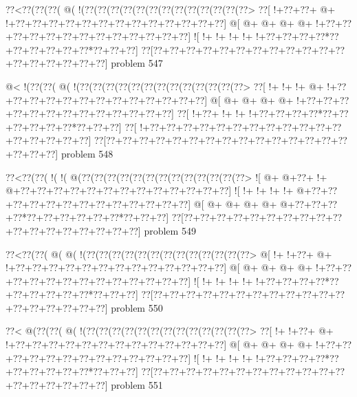 \vbox{\vbox{\goo
\0??<\0??(\0??(\0??(\- @(\- !(\0??(\0??(\0??(\0??(\0??(\0??(\0??(\0??(\0??(\0??(\0??(\0??(\0??>
\0??[\- !+\0??+\0??+\- @+\- !+\0??+\0??+\0??+\0??+\0??+\0??+\0??+\0??+\0??+\0??+\0??+\0??+\0??]
\- @[\- @+\- @+\- @+\- @+\- !+\0??+\0??+\0??+\0??+\0??+\0??+\0??+\0??+\0??+\0??+\0??+\0??+\0??]
\- ![\- !+\- !+\- !+\- !+\- !+\0??+\0??+\0??+\0??*\0??+\0??+\0??+\0??+\0??+\0??*\0??+\0??+\0??]
\0??[\0??+\0??+\0??+\0??+\0??+\0??+\0??+\0??+\0??+\0??+\0??+\0??+\0??+\0??+\0??+\0??+\0??+\0??]
}
\hfil problem 547\hfil\break
}



\vbox{\vbox{\goo
\- @<\- !(\0??(\0??(\- @(\- !(\0??(\0??(\0??(\0??(\0??(\0??(\0??(\0??(\0??(\0??(\0??(\0??(\0??>
\0??[\- !+\- !+\- !+\- @+\- !+\0??+\0??+\0??+\0??+\0??+\0??+\0??+\0??+\0??+\0??+\0??+\0??+\0??]
\- @[\- @+\- @+\- @+\- @+\- !+\0??+\0??+\0??+\0??+\0??+\0??+\0??+\0??+\0??+\0??+\0??+\0??+\0??]
\0??[\- !+\0??+\- !+\- !+\- !+\0??+\0??+\0??+\0??*\0??+\0??+\0??+\0??+\0??+\0??*\0??+\0??+\0??]
\0??[\- !+\0??+\0??+\0??+\0??+\0??+\0??+\0??+\0??+\0??+\0??+\0??+\0??+\0??+\0??+\0??+\0??+\0??]
\0??[\0??+\0??+\0??+\0??+\0??+\0??+\0??+\0??+\0??+\0??+\0??+\0??+\0??+\0??+\0??+\0??+\0??+\0??]
}
\hfil problem 548\hfil\break
}



\vbox{\vbox{\goo
\0??<\0??(\0??(\- !(\- !(\- @(\0??(\0??(\0??(\0??(\0??(\0??(\0??(\0??(\0??(\0??(\0??(\0??(\0??>
\- ![\- @+\- @+\0??+\- !+\- @+\0??+\0??+\0??+\0??+\0??+\0??+\0??+\0??+\0??+\0??+\0??+\0??+\0??]
\- ![\- !+\- !+\- !+\- !+\- @+\0??+\0??+\0??+\0??+\0??+\0??+\0??+\0??+\0??+\0??+\0??+\0??+\0??]
\- @[\- @+\- @+\- @+\- @+\- @+\0??+\0??+\0??+\0??*\0??+\0??+\0??+\0??+\0??+\0??*\0??+\0??+\0??]
\0??[\0??+\0??+\0??+\0??+\0??+\0??+\0??+\0??+\0??+\0??+\0??+\0??+\0??+\0??+\0??+\0??+\0??+\0??]
}
\hfil problem 549\hfil\break
}



\vbox{\vbox{\goo
\0??<\0??(\0??(\- @(\- @(\- !(\0??(\0??(\0??(\0??(\0??(\0??(\0??(\0??(\0??(\0??(\0??(\0??(\0??>
\- @[\- !+\- !+\0??+\- @+\- !+\0??+\0??+\0??+\0??+\0??+\0??+\0??+\0??+\0??+\0??+\0??+\0??+\0??]
\- @[\- @+\- @+\- @+\- @+\- !+\0??+\0??+\0??+\0??+\0??+\0??+\0??+\0??+\0??+\0??+\0??+\0??+\0??]
\- ![\- !+\- !+\- !+\- !+\- !+\0??+\0??+\0??+\0??*\0??+\0??+\0??+\0??+\0??+\0??*\0??+\0??+\0??]
\0??[\0??+\0??+\0??+\0??+\0??+\0??+\0??+\0??+\0??+\0??+\0??+\0??+\0??+\0??+\0??+\0??+\0??+\0??]
}
\hfil problem 550\hfil\break
}



\vbox{\vbox{\goo
\0??<\- @(\0??(\0??(\- @(\- !(\0??(\0??(\0??(\0??(\0??(\0??(\0??(\0??(\0??(\0??(\0??(\0??(\0??>
\0??[\- !+\- !+\0??+\- @+\- !+\0??+\0??+\0??+\0??+\0??+\0??+\0??+\0??+\0??+\0??+\0??+\0??+\0??]
\- @[\- @+\- @+\- @+\- @+\- !+\0??+\0??+\0??+\0??+\0??+\0??+\0??+\0??+\0??+\0??+\0??+\0??+\0??]
\- ![\- !+\- !+\- !+\- !+\- !+\0??+\0??+\0??+\0??*\0??+\0??+\0??+\0??+\0??+\0??*\0??+\0??+\0??]
\0??[\0??+\0??+\0??+\0??+\0??+\0??+\0??+\0??+\0??+\0??+\0??+\0??+\0??+\0??+\0??+\0??+\0??+\0??]
}
\hfil problem 551\hfil\break
}



